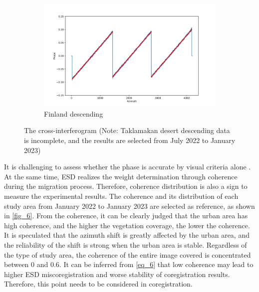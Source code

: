 \documentclass[a4paper,fleqn]{cas-sc}
\begin{document}
\begin{figure}
\begin{subfigure}{0.5\textwidth}
\begin{minipage}{0.5\textwidth}
        \end{minipage}%
        \begin{minipage}{0.5\textwidth}
            \centering
            \includegraphics[width=\textwidth]{figure/The cross-interferogram/cross_interf_Finland_des_row&fitted_20230102.png}
        \end{minipage}
        \caption{Finland descending}
        \label{fig_5i}
    \end{subfigure}%
    \caption{The cross-interferogram (Note: Taklamakan desert descending data is incomplete, and the results are selected from July 2022 to January 2023)}
    \label{fig_5}
\end{figure}

It is challenging to assess whether the phase is accurate by visual criteria alone \cite{An_enhanced_spectral_diversity_coregistration_method_for_dual-polarimetric_Sentinel-1A/B_TOPS_data}. At the same time, ESD realizes the weight determination through coherence during the migration process. Therefore, coherence distribution is also a sign to measure the experimental results. The coherence and its distribution of each study area from January 2022 to January 2023 are selected as reference, as shown in \ref{fig_6}. From the coherence, it can be clearly judged that the urban area has high coherence, and the higher the vegetation coverage, the lower the coherence. It is speculated that the azimuth shift is greatly affected by the urban area, and the reliability of the shift is strong when the urban area is stable. Regardless of the type of study area, the coherence of the entire image covered is concentrated between 0 and 0.6. It can be inferred from \ref{eq_6} that low coherence may lead to higher ESD miscoregistration and worse stability of coregistration results. Therefore, this point needs to be considered in coregistration. \par
\end{document}
